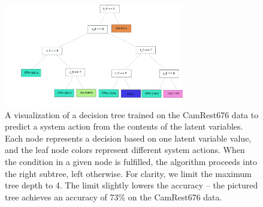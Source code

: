 \begin{figure}[t]
    \centering
    \includegraphics[width=0.70\textwidth]{images/dt2.pdf}
    \vspace{-5mm}
    \caption{A visualization of a decision tree trained on the CamRest676 data to predict a system action from the contents of the latent variables. Each node represents a decision based on one latent variable value, and the leaf node colors represent different system actions. When the condition in a given node is fulfilled, the algorithm proceeds into the right subtree, left otherwise. For clarity, we limit the maximum tree depth to 4. The limit slightly lowers the accuracy -- the pictured tree achieves an accuracy of 73\% on the CamRest676 data.}
    \label{fig:dt}
\end{figure}

